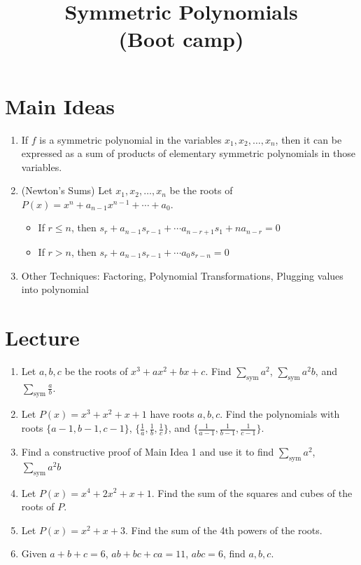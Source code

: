 \documentclass[11pt]{article}
\begin{document}
\title{Symmetric Polynomials \\ (Boot camp)}
\date{}
\maketitle
\vspace{-50 pt}

\section{Main Ideas}
\begin{enumerate}
\item If $f$ is a symmetric polynomial in the variables $x_1,x_2,\ldots, x_n$, then it can be expressed as a sum of products of elementary symmetric polynomials in those variables.
\item (Newton's Sums) Let $x_1,x_2,\ldots, x_n$ be the roots of $P(x)=x^n+a_{n-1}x^{n-1}+\cdots+a_0$.
\begin{itemize}
\item If $r\le n$, then $s_r+a_{n-1}s_{r-1}+\cdots a_{n-r+1}s_{1}+na_{n-r}=0$
\item If $r > n$, then $s_r+a_{n-1}s_{r-1}+\cdots a_{0}s_{r-n}=0$
\end{itemize}
\item Other Techniques: Factoring, Polynomial Transformations, Plugging values into polynomial
\end{enumerate}


\section{Lecture}
\begin{enumerate}
\item Let $a,b,c$ be the roots of $x^3+ax^2+bx+c$. Find $\displaystyle\sum_{\text{sym}}a^2$, $\displaystyle\sum_{\text{sym}}a^2b$, and $\displaystyle\sum_{\text{sym}} \frac{a}{b}$.
\item Let $P(x)= x^3 + x^2 + x + 1$ have roots $a,b,c$. Find the polynomials with roots $\{a-1, b-1, c-1\}$, $\{\frac{1}{a}, \frac{1}{b}, \frac{1}{c}\}$, and $\{\frac{1}{a-1}, \frac{1}{b-1}, \frac{1}{c-1}\}$.
\item Find a constructive proof of Main Idea 1 and use it to find $\displaystyle\sum_{\text{sym}}a^2$, $\displaystyle\sum_{\text{sym}}a^2b$
\item Let $P(x)=x^4 + 2x^2 + x + 1$. Find the sum of the squares and cubes of the roots of $P$.
\item Let $P(x) = x^2 + x + 3$. Find the sum of the 4th powers of the roots.
\item Given $a+b+c=6$, $ab+bc+ca = 11$, $abc=6$, find $a,b,c$.
\end{enumerate}
\end{document}
